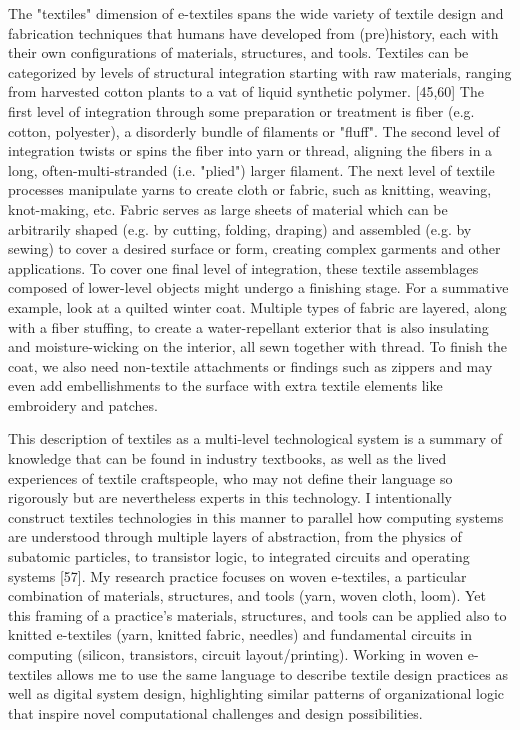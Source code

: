 The "textiles" dimension of e-textiles spans the wide variety of textile design and fabrication techniques that humans have developed from (pre)history, each with their own configurations of materials, structures, and tools. Textiles can be categorized by levels of structural integration starting with raw materials, ranging from harvested cotton plants to a vat of liquid synthetic polymer. [45,60] The first level of integration through some preparation or treatment is fiber (e.g. cotton, polyester), a disorderly bundle of filaments or "fluff". The second level of integration twists or spins the fiber into yarn or thread, aligning the fibers in a long, often-multi-stranded (i.e. "plied") larger filament. The next level of textile processes manipulate yarns to create cloth or fabric, such as knitting, weaving, knot-making, etc. Fabric serves as large sheets of material which can be arbitrarily shaped (e.g. by cutting, folding, draping) and assembled (e.g. by sewing) to cover a desired surface or form, creating complex garments and other applications. To cover one final level of integration, these textile assemblages composed of lower-level objects might undergo a finishing stage. For a summative example, look at a quilted winter coat. Multiple types of fabric are layered, along with a fiber stuffing, to create a water-repellant exterior that is also insulating and moisture-wicking on the interior, all sewn together with thread. To finish the coat, we also need non-textile attachments or findings such as zippers and may even add embellishments to the surface with extra textile elements like embroidery and patches.

This description of textiles as a multi-level technological system is a summary of knowledge that can be found in industry textbooks, as well as the lived experiences of textile craftspeople, who may not define their language so rigorously but are nevertheless experts in this technology. I intentionally construct textiles technologies in this manner to parallel how computing systems are understood through multiple layers of abstraction, from the physics of subatomic particles, to transistor logic, to integrated circuits and operating systems [57]. My research practice focuses on woven e-textiles, a particular combination of materials, structures, and tools (yarn, woven cloth, loom). Yet this framing of a practice's materials, structures, and tools can be applied also to knitted e-textiles (yarn, knitted fabric, needles) and fundamental circuits in computing (silicon, transistors, circuit layout/printing). Working in woven e-textiles allows me to use the same language to describe textile design practices as well as digital system design, highlighting similar patterns of organizational logic that inspire novel computational challenges and design possibilities.

